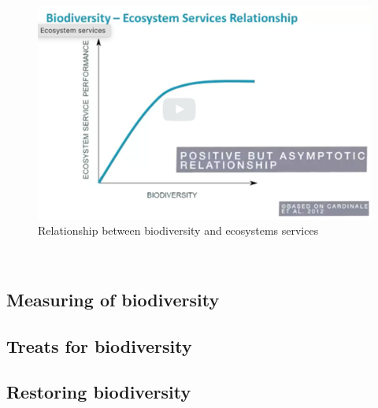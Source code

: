 \documentclass[../summary.tex]{subfiles}
\begin{document}
	\begin{figure}[htbp]
		\centering
		\includegraphics[width=1\linewidth]{images/2-biodiversity-ecosystem-services-relationship.png}
		\caption{Relationship between biodiversity and ecosystems services}
		\label{fig:relationship_biodiversity_ecosystems_services}
	\end{figure} 
	\\
	
	
	\subsection{Measuring of biodiversity}
	
	\subsection{Treats for biodiversity} 

	\subsection{Restoring biodiversity}

	
	
	
	
\end{document}
